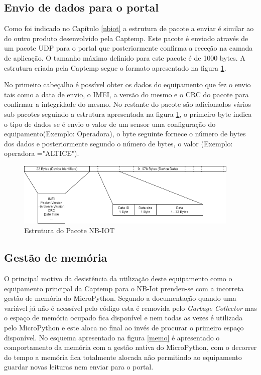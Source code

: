 \subsection {Envio de dados para o portal}

\par Como foi indicado no Capítulo \ref{nbiot} a estrutura de pacote a enviar é similar ao do outro produto desenvolvido pela Captemp. Este pacote é enviado através de um pacote UDP para o portal que posteriormente confirma a receção na camada de aplicação. O tamanho máximo definido para este pacote é de 1000 bytes.
A estrutura criada pela Captemp segue o formato apresentado na figura \ref{packet}.
\par No primeiro cabeçalho é possível obter os dados do equipamento que fez o envio tais como a data de envio, o IMEI, a versão do mesmo e o CRC do pacote para confirmar a integridade do mesmo. No restante do pacote são adicionados vários sub pacotes seguindo a estrutura apresentada na figura \ref {packet}, o primeiro byte indica o tipo de dados se é envio o valor de um sensor uma configuração do equipamento(Exemplo: Operadora), o byte seguinte fornece o número de bytes dos dados e posteriormente segundo o número de bytes, o valor (Exemplo: operadora ="ALTICE").

\begin{figure}[ht]
\centering
\includegraphics[width=0.95\textwidth]{images/packetnb.png}
\caption{Estrutura do Pacote NB-IOT}\label{packet}
\end{figure}

\subsection {Gestão de memória}

\par O principal motivo da desistência da utilização deste equipamento como o equipamento principal da Captemp para o NB-Iot prendeu-se com a incorreta gestão de memória do MicroPython. Segundo a documentação quando uma variável já não é acessível pelo código esta é removida pelo \textit{Garbage Collector} mas o espaço de memória ocupado fica disponível e nem todas as vezes é utilizada pelo MicroPython e este aloca no final ao invés de procurar o primeiro espaço disponível. No esquema apresentado na figura \ref{memo} é apresentado o comportamento da memória com a gestão nativa do MicroPython, com o decorrer do tempo a memória fica totalmente alocada não permitindo ao equipamento guardar novas leituras nem enviar para o portal.


